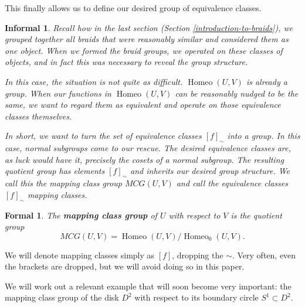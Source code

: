 \documentclass{amsart}
\DeclareMathOperator{\Homeo}{Homeo}
\newtheorem*{formal}{Formal}
\newtheorem*{informal}{Informal}
\begin{document}
This finally allows us to define our desired group of equivalence classes.
\begin{definition}\label{mcg}
	\begin{informal}
		Recall how in the last section (Section \ref{introduction-to-braids}), we
		grouped together all braids that were reasonably similar and considered
		them as one object. When we formed the braid groups, we operated on these
		classes of objects, and in fact this was necessary to reveal the group
		structure.

		In this case, the situation is not quite as difficult. \(\Homeo(U, V)\) is
		already a group. When our functions in 
		\(\Homeo(U, V)\) can be reasonably nudged to be the same, we want to
		regard them as equivalent and operate on
		those equivalence classes themselves.

		In short, we want to turn the set of equivalence classes \([f]_\sim\)
		into a group. In this case, normal subgroups come to our rescue. The
		desired equivalence classes are, as luck would have it, precisely the
		cosets of a normal subgroup. The resulting quotient group has elements
		\([f]_\sim\) and inherits our desired group structure. We call this the
		\emph{mapping class group} \(MCG(U, V)\) and call the equivalence classes
		\([f]_\sim\) \emph{mapping classes}.
	\end{informal}

	\begin{formal}
	   The \textbf{mapping class group} of \(U\) with respect to \(V\) is the
		quotient group 
		\[
	      MCG(U, V) = \Homeo(U, V) / \Homeo_0(U, V).
	   \]
	\end{formal}
\end{definition}

We will denote mapping classes simply as \([f]\), dropping the \(\sim\). Very
often, even the brackets are dropped, but we will avoid doing so in this paper.

We will work out a relevant example that will soon become very important: the
mapping class group of the disk
\(D^2\) with respect to its boundary circle \(S^1\subset D^2\).
\end{document}
